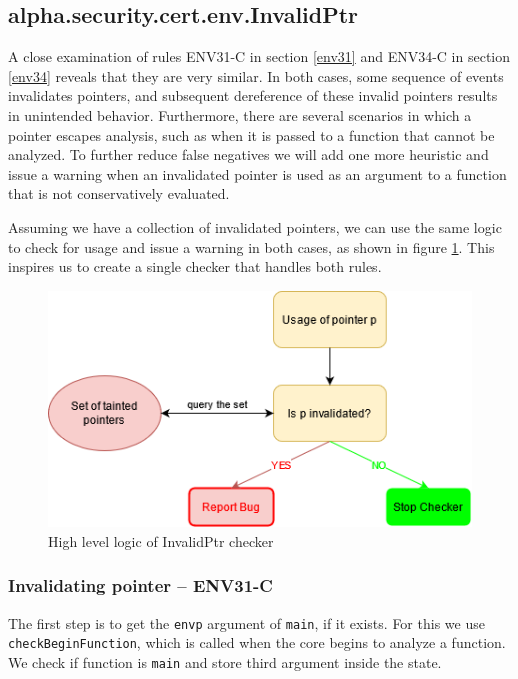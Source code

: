 \subsection{alpha.security.cert.env.InvalidPtr} \label{invalidptr}
A close examination of rules ENV31-C in section \ref{env31} and ENV34-C in section \ref{env34} reveals that they are very similar.
In both cases, some sequence of events invalidates pointers, and subsequent dereference of these invalid pointers results in unintended behavior. Furthermore, there are several scenarios in which a pointer escapes analysis, such as when it is passed to a function that cannot be analyzed. To further reduce false negatives we will add one more heuristic and issue a warning when an invalidated pointer is used as an argument to a function that is not conservatively evaluated. 

Assuming we have a collection of invalidated pointers, we can use the same logic to check for usage and issue a warning in both cases, as shown in figure \ref{fig:invalidptr}. This inspires us to create a single checker that handles both rules. 

\begin{figure}[H]
	\centering
	\includegraphics[]{images/invalid_ptr.png}
	\caption{High level logic of InvalidPtr checker}
	\label{fig:invalidptr}
\end{figure}


\subsubsection{Invalidating pointer -- ENV31-C} \label{invalidate-env31}
The first step is to get the \lstinline{envp} argument of \lstinline{main}, if it exists. For this we use \lstinline{checkBeginFunction}, which is called when the core begins to analyze a function. We check if function is \lstinline{main} and store third argument inside the state.

